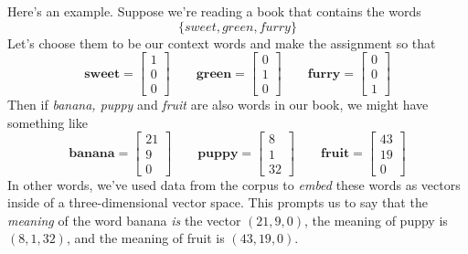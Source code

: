 \documentclass{tufte-handout-tai}
\theoremstyle{plain}
\theoremstyle{definition}
\theoremstyle{remark}
\begin{document}
Here's an example. Suppose we're reading a book that contains the words
\[\{ \textit{sweet},\textit{green},  \textit{furry} \}\]
Let's choose them to be our context words and make the assignment
so that \[
\mathbf{sweet} = \begin{bmatrix}1\\0\\0\end{bmatrix} \qquad 
\mathbf{green} = \begin{bmatrix}0\\1\\0\end{bmatrix}\qquad 
\mathbf{furry}=\begin{bmatrix}0\\0\\1\end{bmatrix}\] 
Then if \textit{banana, puppy} and \textit{fruit} are also words in our book, we might have something like
\[\mathbf{banana} = \begin{bmatrix}21\\9\\0\end{bmatrix}\qquad 
\mathbf{puppy} = \begin{bmatrix}8\\1\\32\end{bmatrix} \qquad 
\mathbf{fruit} = \begin{bmatrix}43\\19\\0\end{bmatrix}\]
In other words, we've used data from the corpus to \textit{embed} these words as vectors inside of a three-dimensional vector space. This prompts us to say that the \textit{meaning} of the word banana \textit{is} the vector $(21,9,0)$, the meaning of puppy is $(8,1,32)$, and the meaning of fruit is $(43,19,0)$. 
\end{document}

